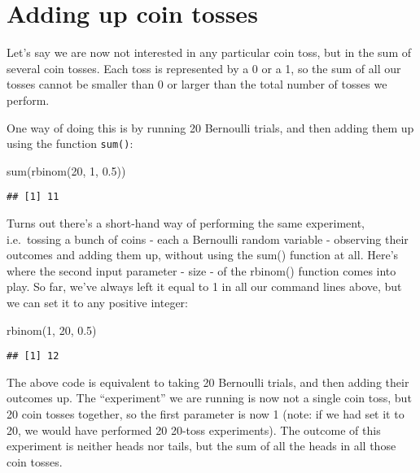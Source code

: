 \documentclass[
]{book}
\newenvironment{Shaded}{\begin{snugshade}}{\end{snugshade}}
\newcommand{\DecValTok}[1]{\textcolor[rgb]{0.00,0.00,0.81}{#1}}
\newcommand{\FloatTok}[1]{\textcolor[rgb]{0.00,0.00,0.81}{#1}}
\newcommand{\FunctionTok}[1]{\textcolor[rgb]{0.00,0.00,0.00}{#1}}
\newcommand{\NormalTok}[1]{#1}
\begin{document}
\hypertarget{adding-up-coin-tosses}{%
\section{Adding up coin tosses}\label{adding-up-coin-tosses}}

Let's say we are now not interested in any particular coin toss, but in the sum of several coin tosses. Each toss is represented by a 0 or a 1, so the sum of all our tosses cannot be smaller than 0 or larger than the total number of tosses we perform.

One way of doing this is by running 20 Bernoulli trials, and then adding them up using the function \texttt{sum()}:

\begin{Shaded}
\begin{Highlighting}[]
\FunctionTok{sum}\NormalTok{(}\FunctionTok{rbinom}\NormalTok{(}\DecValTok{20}\NormalTok{, }\DecValTok{1}\NormalTok{, }\FloatTok{0.5}\NormalTok{))}
\end{Highlighting}
\end{Shaded}

\begin{verbatim}
## [1] 11
\end{verbatim}

Turns out there's a short-hand way of performing the same experiment, i.e.~tossing a bunch of coins - each a Bernoulli random variable - observing their outcomes and adding them up, without using the sum() function at all. Here's where the second input parameter - size - of the rbinom() function comes into play. So far, we've always left it equal to 1 in all our command lines above, but we can set it to any positive integer:

\begin{Shaded}
\begin{Highlighting}[]
\FunctionTok{rbinom}\NormalTok{(}\DecValTok{1}\NormalTok{, }\DecValTok{20}\NormalTok{, }\FloatTok{0.5}\NormalTok{)}
\end{Highlighting}
\end{Shaded}

\begin{verbatim}
## [1] 12
\end{verbatim}

The above code is equivalent to taking 20 Bernoulli trials, and then adding their outcomes up. The ``experiment'' we are running is now not a single coin toss, but 20 coin tosses together, so the first parameter is now 1 (note: if we had set it to 20, we would have performed 20 20-toss experiments). The outcome of this experiment is neither heads nor tails, but the sum of all the heads in all those coin tosses.
\end{document}
